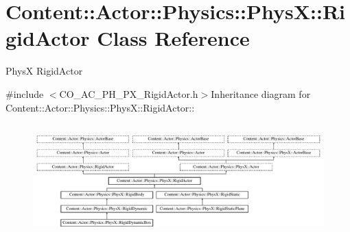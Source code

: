 \hypertarget{classContent_1_1Actor_1_1Physics_1_1PhysX_1_1RigidActor}{
\section{Content::Actor::Physics::PhysX::RigidActor Class Reference}
\label{classContent_1_1Actor_1_1Physics_1_1PhysX_1_1RigidActor}
}


PhysX RigidActor  


{\ttfamily \#include $<$CO\_\-AC\_\-PH\_\-PX\_\-RigidActor.h$>$}Inheritance diagram for Content::Actor::Physics::PhysX::RigidActor::\begin{figure}[H]
\begin{center}
\leavevmode
\includegraphics[height=4.39955cm]{classContent_1_1Actor_1_1Physics_1_1PhysX_1_1RigidActor}
\end{center}
\end{figure}
